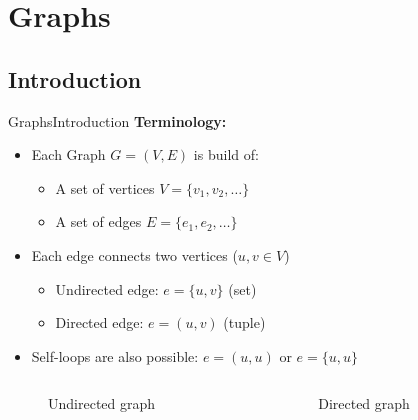 \section{Graphs}
\subsection{Introduction}

\begin{frame}{Graphs}{Introduction}
  \textbf{Terminology:}
  \begin{itemize}
    \item<2->
      Each Graph {\color{Mittel-Blau}$G = (V, E)$} is build of:
      \begin{itemize}
        \item<3->
          A set of vertices {\color{Mittel-Blau}$V = \{v_1, v_2, \dotsc\}$}
        \item<4->
          A set of edges {\color{Mittel-Blau}$E = \{e_1, e_2, \dotsc\}$}
       \end{itemize}
     \item<5->
       Each edge connects two vertices
       ({\color{Mittel-Blau}$u, v \in V$})
       \begin{itemize}
         \item<6->
           Undirected edge: {\color{Mittel-Blau}$e = \{u, v\}$} (set)
         \item<7->
           Directed edge: {\color{Mittel-Blau}$e = (u, v)$} (tuple)
        \end{itemize}
      \item<8->
        Self-loops are also possible:
        {\color{Mittel-Blau}$e = (u, u)$} or
        {\color{Mittel-Blau}$e = \{u, u\}$}
  \end{itemize}
  \vspace{-1.0em}
  \begin{columns}
    \begin{column}[b]{0.5\linewidth}
      \begin{figure}
        \begin{adjustbox}{width=0.75\linewidth}
          
        \end{adjustbox}
        \caption{Undirected graph}
        \label{fig:graphs:introduction_undirected}
      \end{figure}
    \end{column}
    \begin{column}[b]{0.5\linewidth}
      \begin{figure}
        \begin{adjustbox}{width=0.75\linewidth}
          
        \end{adjustbox}
        \vspace{-1.0em}
        \caption{Directed graph}
        \label{fig:graphs:introduction_directed}
      \end{figure}
    \end{column}
  \end{columns}
\end{frame}

